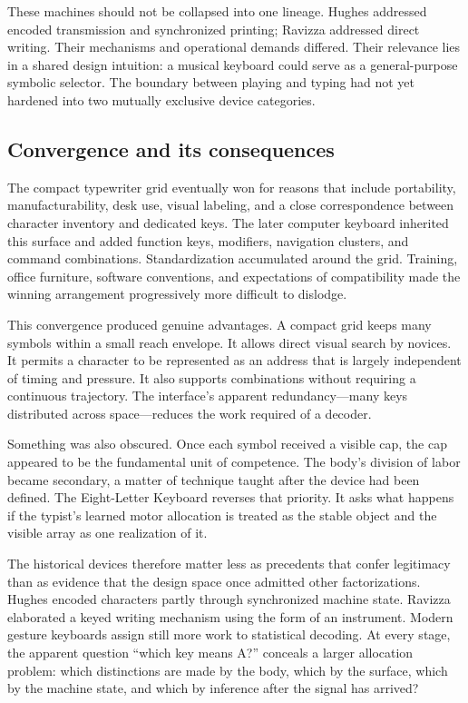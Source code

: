 \documentclass[11pt]{article}
\begin{document}
These machines should not be collapsed into one lineage. Hughes addressed encoded transmission and synchronized printing; Ravizza addressed direct writing. Their mechanisms and operational demands differed. Their relevance lies in a shared design intuition: a musical keyboard could serve as a general-purpose symbolic selector. The boundary between playing and typing had not yet hardened into two mutually exclusive device categories.

\subsection{Convergence and its consequences}

The compact typewriter grid eventually won for reasons that include portability, manufacturability, desk use, visual labeling, and a close correspondence between character inventory and dedicated keys. The later computer keyboard inherited this surface and added function keys, modifiers, navigation clusters, and command combinations. Standardization accumulated around the grid. Training, office furniture, software conventions, and expectations of compatibility made the winning arrangement progressively more difficult to dislodge.

This convergence produced genuine advantages. A compact grid keeps many symbols within a small reach envelope. It allows direct visual search by novices. It permits a character to be represented as an address that is largely independent of timing and pressure. It also supports combinations without requiring a continuous trajectory. The interface's apparent redundancy---many keys distributed across space---reduces the work required of a decoder.

Something was also obscured. Once each symbol received a visible cap, the cap appeared to be the fundamental unit of competence. The body's division of labor became secondary, a matter of technique taught after the device had been defined. The Eight-Letter Keyboard reverses that priority. It asks what happens if the typist's learned motor allocation is treated as the stable object and the visible array as one realization of it.

The historical devices therefore matter less as precedents that confer legitimacy than as evidence that the design space once admitted other factorizations. Hughes encoded characters partly through synchronized machine state. Ravizza elaborated a keyed writing mechanism using the form of an instrument. Modern gesture keyboards assign still more work to statistical decoding. At every stage, the apparent question ``which key means A?'' conceals a larger allocation problem: which distinctions are made by the body, which by the surface, which by the machine state, and which by inference after the signal has arrived?
\end{document}
